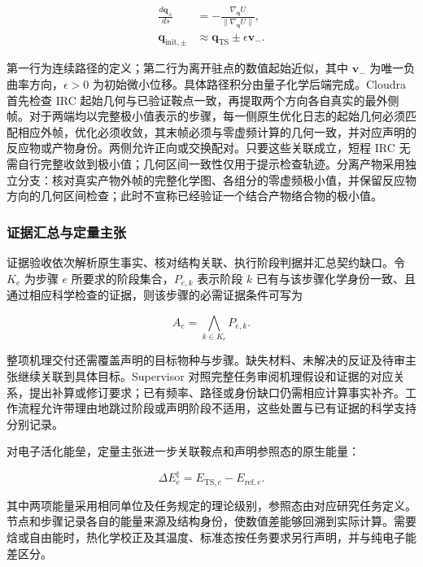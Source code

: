 \begin{equation}\label{eq:methods-12}
\begin{aligned}
\frac{d\mathbf q_{\pm}}{ds}&=-\frac{\nabla_{\mathbf q}U}{\|\nabla_{\mathbf q}U\|},\\
\mathbf q_{\mathrm{init},\pm}&\approx\mathbf q_{\mathrm{TS}}\pm\epsilon\mathbf v_{-}.
\end{aligned}
\end{equation}

第一行为连续路径的定义；第二行为离开驻点的数值起始近似，其中 $\mathbf v_-$ 为唯一负曲率方向，$\epsilon>0$ 为初始微小位移。具体路径积分由量子化学后端完成。Cloudra 首先检查 IRC 起始几何与已验证鞍点一致，再提取两个方向各自真实的最外侧帧。对于两端均以完整极小值表示的步骤，每一侧原生优化日志的起始几何必须匹配相应外帧，优化必须收敛，其末帧必须与零虚频计算的几何一致，并对应声明的反应物或产物身份。两侧允许正向或交换配对。只要这些关联成立，短程 IRC 无需自行完整收敛到极小值；几何区间一致性仅用于提示检查轨迹。分离产物采用独立分支：核对真实产物外帧的完整化学图、各组分的零虚频极小值，并保留反应物方向的几何区间检查；此时不宣称已经验证一个结合产物络合物的极小值。

\subsubsection{证据汇总与定量主张}

证据验收依次解析原生事实、核对结构关联、执行阶段判据并汇总契约缺口。令 $K_e$ 为步骤 $e$ 所要求的阶段集合，$P_{e,k}$ 表示阶段 $k$ 已有与该步骤化学身份一致、且通过相应科学检查的证据，则该步骤的必需证据条件可写为

\begin{equation}\label{eq:methods-13}
A_e=\bigwedge_{k\in K_e}P_{e,k}.
\end{equation}

整项机理交付还需覆盖声明的目标物种与步骤。缺失材料、未解决的反证及待审主张继续关联到具体目标。Supervisor 对照完整任务审阅机理假设和证据的对应关系，提出补算或修订要求；已有频率、路径或身份缺口仍需相应计算事实补齐。工作流程允许带理由地跳过阶段或声明阶段不适用，这些处置与已有证据的科学支持分别记录。

对电子活化能垒，定量主张进一步关联鞍点和声明参照态的原生能量：

\begin{equation}\label{eq:methods-14}
\Delta E_e^{\ddagger}=E_{\mathrm{TS},e}-E_{\mathrm{ref},e}.
\end{equation}

其中两项能量采用相同单位及任务规定的理论级别，参照态由对应研究任务定义。节点和步骤记录各自的能量来源及结构身份，使数值差能够回溯到实际计算。需要焓或自由能时，热化学校正及其温度、标准态按任务要求另行声明，并与纯电子能差区分。

